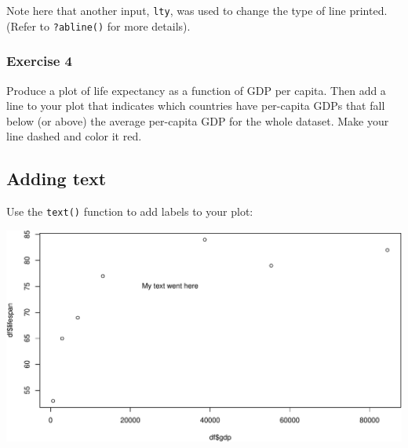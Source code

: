 \documentclass[
]{book}
\newenvironment{Shaded}{\begin{snugshade}}{\end{snugshade}}
\newcommand{\DataTypeTok}[1]{\textcolor[rgb]{0.13,0.29,0.53}{#1}}
\newcommand{\DecValTok}[1]{\textcolor[rgb]{0.00,0.00,0.81}{#1}}
\newcommand{\KeywordTok}[1]{\textcolor[rgb]{0.13,0.29,0.53}{\textbf{#1}}}
\newcommand{\NormalTok}[1]{#1}
\newcommand{\OperatorTok}[1]{\textcolor[rgb]{0.81,0.36,0.00}{\textbf{#1}}}
\newcommand{\StringTok}[1]{\textcolor[rgb]{0.31,0.60,0.02}{#1}}
\begin{document}
Note here that another input, \texttt{lty}, was used to change the type of line printed. (Refer to \texttt{?abline()} for more details).

\hypertarget{exercise-4-1}{%
\subsubsection*{Exercise 4}\label{exercise-4-1}}

Produce a plot of life expectancy as a function of GDP per capita. Then add a line to your plot that indicates which countries have per-capita GDPs that fall below (or above) the average per-capita GDP for the whole dataset. Make your line dashed and color it red.

\hypertarget{adding-text}{%
\subsection*{Adding text}\label{adding-text}}

Use the \texttt{text()} function to add labels to your plot:

\begin{Shaded}
\end{Shaded}

\includegraphics{figures/unnamed-chunk-119-1.pdf}
\end{document}
